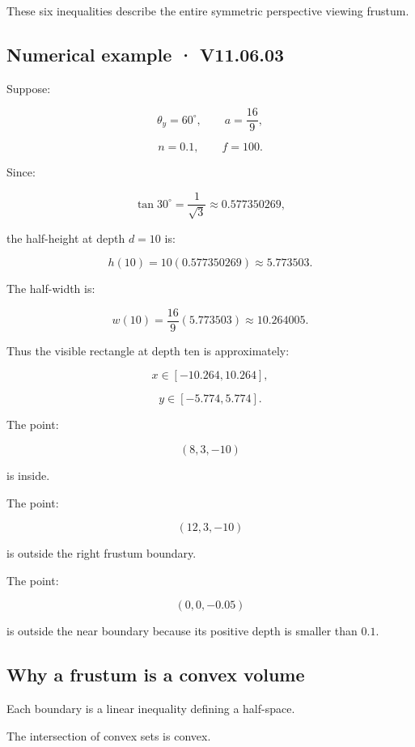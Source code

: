 These six inequalities describe the entire symmetric perspective viewing frustum.

\subsection{Numerical example · V11.06.03}\label{02-foundations-ii-ch034-numerical-example-v11.06.03}

\hypertarget{02-foundations-ii-ch034-numerical-example-v11.06.03}{}

Suppose:

\[
 \theta_y=60^\circ,\qquad a=\frac{16}{9},
\]

\[
 n=0.1,\qquad f=100.
\]

Since:

\[
 \tan30^\circ=\frac1{\sqrt3}\approx0.577350269,
\]

the half-height at depth \(d=10\) is:

\[
 h(10)=10(0.577350269)\approx5.773503.
\]

The half-width is:

\[
 w(10)=\frac{16}{9}(5.773503)\approx10.264005.
\]

Thus the visible rectangle at depth ten is approximately:

\[
 x\in[-10.264,10.264],
\]

\[
 y\in[-5.774,5.774].
\]

The point:

\[
 (8,3,-10)
\]

is inside.

The point:

\[
 (12,3,-10)
\]

is outside the right frustum boundary.

The point:

\[
 (0,0,-0.05)
\]

is outside the near boundary because its positive depth is smaller than \(0.1\).

\subsection{Why a frustum is a convex volume}\label{02-foundations-ii-ch034-why-a-frustum-is-a-convex-volume}

\hypertarget{02-foundations-ii-ch034-why-a-frustum-is-a-convex-volume}{}

Each boundary is a linear inequality defining a half-space.

The intersection of convex sets is convex.


